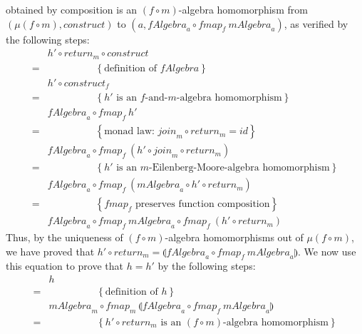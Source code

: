 \documentclass{jfp1}
\newcommand{\fold}[1]{\llparenthesis #1 \rrparenthesis}
\newcommand{\eqAnnotation}[1]{\hspace{2cm}\left\{\textrm{#1}\right\}}
\begin{document}
\begin{proof*}
\begin{enumerate}
    obtained by composition is an $(f \circ m)$-algebra homomorphism
    from $(\mu(f \circ m), \mathit{construct})$ to $(a, \mathit{fAlgebra}_a
    \circ \mathit{fmap}_f~\mathit{mAlgebra}_a)$, as verified by the
    following steps:
    \begin{displaymath}
      \begin{array}{cl}
        & h' \circ \mathit{return}_m \circ \mathit{construct} \\
        =&\eqAnnotation{definition of $\mathit{fAlgebra}$} \\
        & h' \circ \mathit{construct}_f \\
        =&\eqAnnotation{$h'$ is an $f$-and-$m$-algebra homomorphism} \\
        & \mathit{fAlgebra}_a \circ \mathit{fmap}_f~h' \\
        =&\eqAnnotation{monad law: $\mathit{join}_m \circ \mathit{return}_m = \mathit{id}$} \\
        & \mathit{fAlgebra}_a \circ \mathit{fmap}_f~(h' \circ \mathit{join}_m \circ \mathit{return}_m) \\
        =&\eqAnnotation{$h'$ is an $m$-Eilenberg-Moore-algebra homomorphism} \\
        & \mathit{fAlgebra}_a \circ \mathit{fmap}_f~(\mathit{mAlgebra}_a \circ h' \circ \mathit{return}_m) \\
        =&\eqAnnotation{$\mathit{fmap}_f$ preserves function composition} \\
        & \mathit{fAlgebra}_a \circ \mathit{fmap}_f~\mathit{mAlgebra}_a \circ \mathit{fmap}_f~(h' \circ \mathit{return}_m)
      \end{array}
    \end{displaymath}
    Thus, by the uniqueness of $(f \circ m)$-algebra homomorphisms out
    of $\mu(f \circ m)$, we have proved that $h' \circ
    \mathit{return}_m = \fold{\mathit{fAlgebra}_a \circ
      \mathit{fmap}_f~\mathit{mAlgebra}_a}$. We now use this equation
    to prove that $h=h'$ by the following steps:
    \begin{displaymath}
      \begin{array}{cl}
        & h \\
        =&\eqAnnotation{definition of $h$} \\
        &\mathit{mAlgebra}_m \circ \mathit{fmap}_m~\fold{\mathit{fAlgebra}_a \circ \mathit{fmap}_f~\mathit{mAlgebra}_a} \\
        =&\eqAnnotation{$h' \circ \mathit{return}_m$ is an $(f \circ m)$-algebra homomorphism} \\

\end{array}
\end{displaymath}
\end{enumerate}
\end{proof*}
\end{document}
